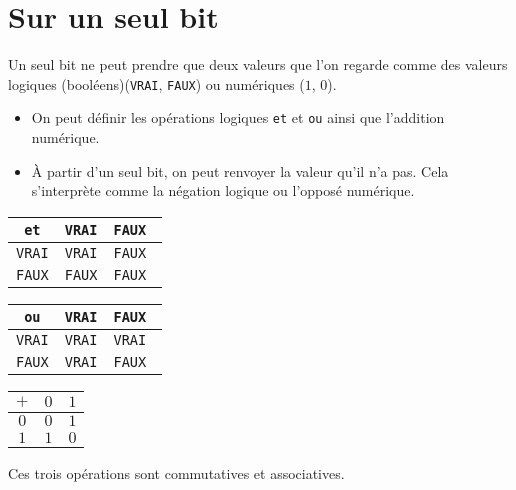 \section{Sur un seul bit}
Un seul bit ne peut prendre que deux valeurs que l'on regarde comme des valeurs logiques (booléens)(\texttt{VRAI}, \texttt{FAUX}) ou numériques ($1$, $0$).
\begin{itemize}
  \item On peut définir les opérations logiques \texttt{et} et \texttt{ou} ainsi que l'addition numérique.
  \item \`A partir d'un seul bit, on peut renvoyer la valeur qu'il n'a pas. Cela s'interprète comme la négation logique ou l'opposé numérique.
\end{itemize}
\begin{center}
\renewcommand{\arraystretch}{1.3}
\hspace{.4cm}
\begin{tabular}{|c|c|c|}
\hline
  \texttt{et}  & \texttt{VRAI} & \texttt{FAUX } \\ \hline
  \texttt{VRAI}& \texttt{VRAI} & \texttt{FAUX } \\ \hline
  \texttt{FAUX}& \texttt{FAUX} & \texttt{FAUX } \\ \hline
\end{tabular} 
\hspace{.4cm}
\begin{tabular}{|c|c|c|}
\hline
  \texttt{ou}  & \texttt{VRAI} & \texttt{FAUX } \\ \hline
  \texttt{VRAI}& \texttt{VRAI} & \texttt{VRAI } \\ \hline
  \texttt{FAUX}& \texttt{VRAI} & \texttt{FAUX } \\ \hline
\end{tabular} 
\hspace{.4cm}
\begin{tabular}{|c|c|c|}
\hline
  $+$ & $0$ & $1$ \\ \hline
  $0$ & $0$ & $1$ \\ \hline
  $1$ & $1$ & $0$ \\ \hline
\end{tabular} 
\hfill  
\end{center}
Ces trois opérations sont commutatives et associatives.

